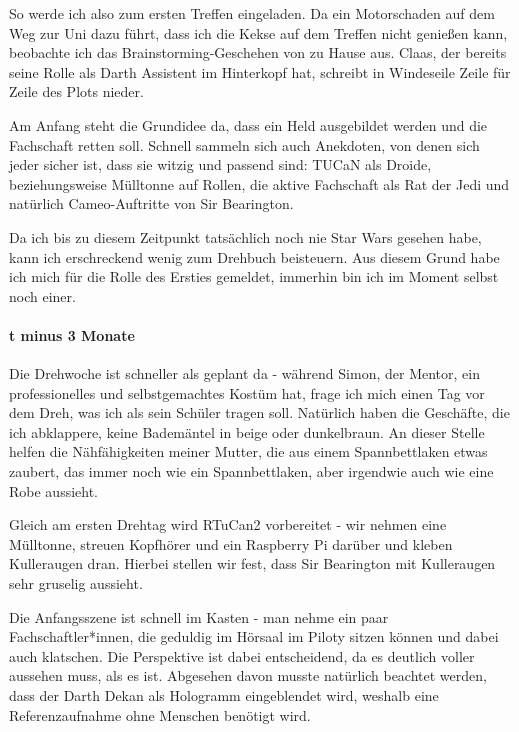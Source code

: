 {So werde ich also zum ersten Treffen eingeladen.
Da ein Motorschaden auf dem Weg zur Uni dazu führt, dass ich die Kekse auf
dem Treffen nicht genießen kann, beobachte ich das Brainstorming-Geschehen von
zu Hause aus. Claas, der bereits seine Rolle als Darth Assistent im Hinterkopf
hat, schreibt in Windeseile Zeile für Zeile des Plots nieder.


Am Anfang steht die Grundidee da, dass ein Held ausgebildet werden und die
Fachschaft retten soll. Schnell sammeln sich auch Anekdoten, von denen sich
jeder sicher ist, dass sie witzig und passend sind: TUCaN als Droide,
beziehungsweise Mülltonne auf Rollen, die aktive Fachschaft als Rat der Jedi
und natürlich Cameo-Auftritte von Sir Bearington.


Da ich bis zu diesem Zeitpunkt tatsächlich noch nie Star Wars gesehen habe,
kann ich erschreckend wenig zum Drehbuch beisteuern. Aus diesem Grund habe
ich mich für die Rolle des Ersties gemeldet, immerhin bin ich im Moment selbst
noch einer.


\paragraph{t minus 3 Monate}
Die Drehwoche ist schneller als geplant da - während Simon, der Mentor, ein
professionelles und selbstgemachtes Kostüm hat, frage ich mich einen Tag vor
dem Dreh, was ich als sein Schüler tragen soll. Natürlich haben die Geschäfte,
die ich abklappere, keine Bademäntel in beige oder dunkelbraun. An dieser
Stelle helfen die Nähfähigkeiten meiner Mutter, die aus einem Spannbettlaken
etwas zaubert, das immer noch wie ein Spannbettlaken, aber irgendwie auch wie
eine Robe aussieht.



Gleich am ersten Drehtag wird RTuCan2 vorbereitet - wir nehmen eine Mülltonne,
streuen Kopfhörer und ein Raspberry Pi darüber und kleben Kulleraugen dran.
Hierbei stellen wir fest, dass Sir Bearington mit Kulleraugen
sehr gruselig aussieht.



Die Anfangsszene ist schnell im Kasten - man nehme ein paar Fachschaftler*innen, die
geduldig im 
Hörsaal im Piloty sitzen können und dabei auch klatschen. Die Perspektive ist
dabei entscheidend, da es deutlich voller aussehen muss, als es ist. Abgesehen
davon musste natürlich beachtet werden, dass der Darth Dekan als Hologramm
eingeblendet wird, weshalb eine Referenzaufnahme ohne Menschen benötigt
wird.


}
